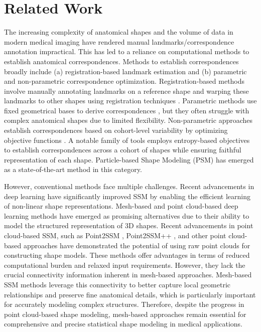 \section{Related Work}

The increasing complexity of anatomical shapes and the volume of data in modern medical imaging have rendered manual landmarks/correspondence annotation impractical. This has led to a reliance on computational methods to establish anatomical correspondences. Methods to establish correspondences broadly include (a) registration-based landmark estimation and (b) parametric and non-parametric correspondence optimization. Registration-based methods involve manually annotating landmarks on a reference shape and warping these landmarks to other shapes using registration techniques \cite{paulsen2002building,heitz2005statistical,mcinerney1996deformable}. Parametric methods use fixed geometrical bases to derive correspondences \cite{styner2006framework}, but they often struggle with complex anatomical shapes due to limited flexibility. Non-parametric approaches establish correspondences based on cohort-level variability by optimizing objective functions \cite{cates2008particle,cates2017shapeworks,dai2020statistical}. A notable family of tools employs entropy-based objectives to establish correspondences \cite{oguz2016entropy,cates2007shape,cates2008particle,cates2017shapeworks} across a cohort of shapes while ensuring faithful representation of each shape. Particle-based Shape Modeling (PSM) has emerged as a state-of-the-art method in this category.

However, conventional methods face multiple challenges. Recent advancements in deep learning have significantly improved SSM by enabling the efficient learning of non-linear shape representations. Mesh-based and point cloud-based deep learning methods have emerged as promising alternatives due to their ability to model the structured representation of 3D shapes. Recent advancements in point cloud-based SSM, such as Point2SSM \cite{adams2023point2ssm}, Point2SSM++ \cite{adams2022images}, and other point cloud-based approaches \cite{lang2021dpc,wang2019dynamic,chen2020unsupervised} have demonstrated the potential of using raw point clouds for constructing shape models. These methods offer advantages in terms of reduced computational burden and relaxed input requirements. However, they lack the crucial connectivity information inherent in mesh-based approaches. Mesh-based SSM methods leverage this connectivity to better capture local geometric relationships and preserve fine anatomical details, which is particularly important for accurately modeling complex structures. Therefore, despite the progress in point cloud-based shape modeling, mesh-based approaches remain essential for comprehensive and precise statistical shape modeling in medical applications.

